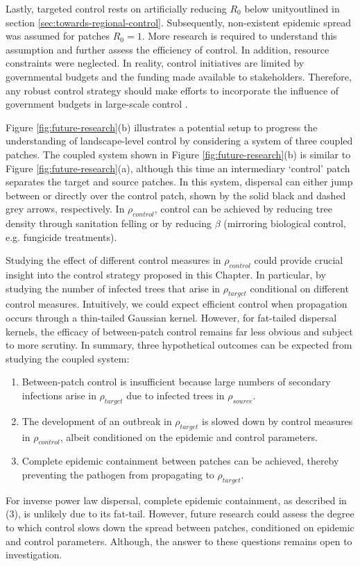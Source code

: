Lastly, targeted control rests on artificially reducing $R_0$ below unity\textemdash outlined in section \ref{sec:towards-regional-control}.
Subsequently, non-existent epidemic spread was assumed for patches $R_0=1$.
More research is required to understand this assumption and further assess the efficiency of control.
In addition, resource constraints were neglected. In reality, control initiatives are limited by governmental budgets and the funding made available to stakeholders.
Therefore, any robust control strategy should make efforts to incorporate the influence of government budgets in large-scale control \cite{large-scale-control}.

Figure \ref{fig:future-research}(b) illustrates a potential setup to progress the understanding of landscape-level control by considering a system of three coupled patches.
The coupled system shown in Figure \ref{fig:future-research}(b) is similar to Figure \ref{fig:future-research}(a), although this time an intermediary `control' patch separates the target and source patches. In this system, dispersal can either jump between or directly over the control patch, shown by the solid black and dashed grey arrows, respectively. In $\rho_{control}$, control can be achieved by reducing tree density through sanitation felling or by reducing $\beta$ (mirroring biological control, e.g. fungicide treatments).

Studying the effect of different control measures in $\rho_{control}$ could provide crucial insight into the control strategy proposed in this Chapter.
In particular, by studying the number of infected trees that arise in $\rho_{target}$ conditional on different control measures. 
Intuitively, we could expect efficient control when propagation occurs through a thin-tailed Gaussian kernel.
However, for fat-tailed dispersal kernels, the efficacy of between-patch control remains far less obvious and subject to more scrutiny.
In summary, three hypothetical outcomes can be expected from studying the coupled system: 
\begin{enumerate}
    \item Between-patch control is insufficient because large numbers of secondary infections arise in $\rho_{target}$ due to infected trees in $\rho_{source}$.
    \item The development of an outbreak in $\rho_{target}$ is slowed down by control measures in $\rho_{control}$, albeit conditioned on the epidemic and control parameters.
    \item Complete epidemic containment between patches can be achieved, thereby preventing the pathogen from propagating to $\rho_{target}$.
\end{enumerate}
For inverse power law dispersal, complete epidemic containment, as described in (3), is unlikely due to its fat-tail.
However, future research could assess the degree to which control slows down the spread between patches, conditioned on epidemic and control parameters. Although, the answer to these questions remains open to investigation.

\newpage












